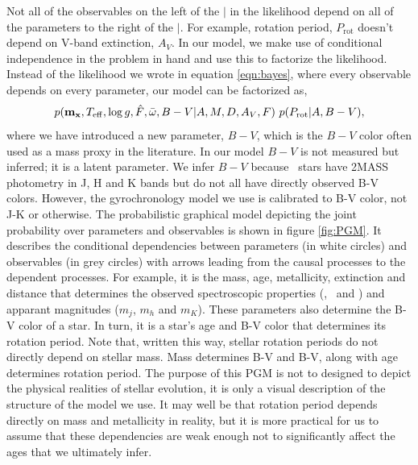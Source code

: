 Not all of the observables on the left of the $|$ in the likelihood depend on
all of the parameters to the right of the $|$.
For example, rotation period, $P_{\mathrm{rot}}$ doesn't depend on V-band
extinction, $A_V$.
In our model, we make use of conditional independence in the problem in hand
and use this to factorize the likelihood.
Instead of the likelihood we wrote in equation \ref{eqn:bayes},
where every observable depends on every parameter, our model can be factorized
as,
\begin{equation}
p({\bf m_x}, T_{\mathrm{eff}}, \log g, \hat{F}, \bar{\omega}, B-V|A, M, D,
    A_V, F)~p(P_{\mathrm{rot}}|A, B-V),
\end{equation}
\label{eqn:factorized}
where we have introduced a new parameter, $B-V$, which is the $B-V$ color
often used as a mass proxy in the literature.
In our model $B-V$ is not measured but inferred; it is a latent parameter.
We infer $B-V$ because \kepler\ stars have 2MASS photometry in J, H and K
bands but do not all have directly observed B-V colors.
However, the gyrochronology model we use is calibrated to B-V color, not J-K
or otherwise.
The probabilistic graphical model depicting the joint probability over
parameters and observables is shown in figure \ref{fig:PGM}.
It describes the conditional dependencies between parameters (in white
circles) and observables (in grey circles) with arrows leading from the causal
processes to the dependent processes.
For example, it is the mass, age, metallicity, extinction and distance that
determines the observed spectroscopic properties (\teff, \logg\ and \feh)
and apparant magnitudes ($m_j$, $m_h$ and $m_K$).
These parameters also determine the B-V color of a star.
In turn, it is a star's age and B-V color that determines its rotation period.
Note that, written this way, stellar rotation periods do not directly depend
on stellar mass.
Mass determines B-V and B-V, along with age determines rotation period.
The purpose of this PGM is not to designed to depict the physical realities of
stellar evolution, it is only a visual description of the structure of the
model we use.
It may well be that rotation period depends directly on mass and metallicity
in reality, but it is more practical for us to assume that these dependencies are
weak enough not to significantly affect the ages that we ultimately infer.


